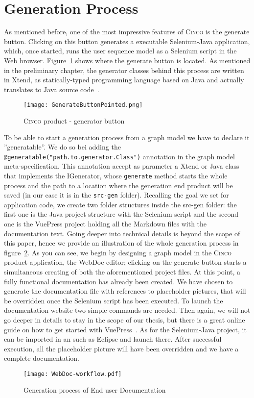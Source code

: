 \section{Generation Process}\label{sec:GenProcess}

As mentioned before, one of the most impressive features of \textsc{Cinco} is the generate button. Clicking on this button generates a executable Selenium-Java application, which, once started, runs the user sequence model  as a Selenium script in the Web browser. Figure~\ref{fig:genButton} shows where the generate button is located. As mentioned in the preliminary chapter, the generator classes behind this process are written in Xtend, as statically-typed programming language based on Java and actually translates to Java source code~\cite{Xtend}. 

\begin{figure}[H]
    \centering
    \texttt{[image: GenerateButtonPointed.png]}
    \caption{\textsc{Cinco} product - generator button}
    \label{fig:genButton}
\end{figure}

To be able to start a generation process from a graph model we have to declare it ''generatable''. We do so bei adding the \lstinline[language=MGL]{@generatable("path.to.generator.Class")} annotation in the graph model meta-specification. This annotation accept as parameter a Xtend or Java class that implements the IGenerator, whose \lstinline{generate} method starts the whole process and the path to a location where the generation end product will be saved (in our case it is in the \lstinline{src-gen} folder). Recalling the goal we set for application code, we create two folder structures inside the src-gen folder: the first one is the Java project structure with the Selenium script and the second one is the VuePress project holding all the Markdown files with the documentation text. Going deeper into technical details is beyond the scope of this paper, hence we provide an illustration of the whole generation process in figure~\ref{fig:WebDocWorkflow}. As you can see, we begin by designing a graph model in the \textsc{Cinco} product application, the WebDoc editor; clicking on the generate button starts a simultaneous creating of both the aforementioned project files. At this point, a fully functional documentation has already been created. We have chosen to generate the documentation file with references to placeholder pictures, that will be overridden once the Selenium script has been executed. To launch the documentation website two simple commands are needed. Then again, we will not go deeper in details to stay in the scope of our thesis, but there is a great online guide on how to get started with VuePress~\cite{vuepress}. As for the Selenium-Java project, it can be imported in an  such as Eclipse and launch there. After successful execution, all the placeholder picture will have been overridden and we have a complete documentation.

\begin{figure}[t]
    \centering
    \texttt{[image: WebDoc-workflow.pdf]}
    \caption{Generation process of End user Documentation}
    \label{fig:WebDocWorkflow}
\end{figure}